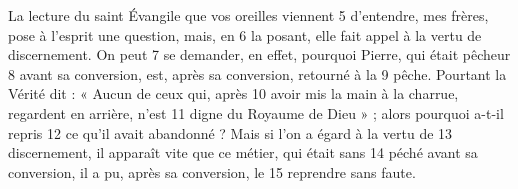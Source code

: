 La lecture du saint Évangile que vos oreilles viennent	 
5	 	d'entendre, mes frères, pose à l'esprit une question, mais, en	 
6	 	la posant, elle fait appel à la vertu de discernement. On peut	 
7	 	se demander, en effet, pourquoi Pierre, qui était pêcheur	 
8	 	avant sa conversion, est, après sa conversion, retourné à la	 
9	 	pêche. Pourtant la Vérité dit : « Aucun de ceux qui, après	 
10	 	avoir mis la main à la charrue, regardent en arrière, n'est	 
11	 	digne du Royaume de Dieu » ; alors pourquoi a-t-il repris	 
12	 	ce qu'il avait abandonné ? Mais si l'on a égard à la vertu de	 
13	 	discernement, il apparaît vite que ce métier, qui était sans	 
14	 	péché avant sa conversion, il a pu, après sa conversion, le	 
15	 	reprendre sans faute.
